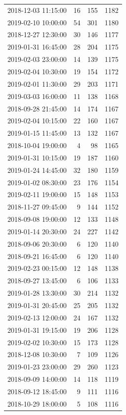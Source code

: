 \begin{tabular}{lrrr}
2018-12-03 11:15:00 & 16 & 155 & 1182 \\
2019-02-10 10:00:00 & 54 & 301 & 1180 \\
2018-12-27 12:30:00 & 30 & 146 & 1177 \\
2019-01-31 16:45:00 & 28 & 204 & 1175 \\
2019-02-03 23:00:00 & 14 & 139 & 1175 \\
2019-02-04 10:30:00 & 19 & 154 & 1172 \\
2019-02-01 11:30:00 & 29 & 203 & 1171 \\
2019-03-03 16:00:00 & 11 & 138 & 1168 \\
2018-09-28 21:45:00 & 14 & 174 & 1167 \\
2019-02-04 10:15:00 & 22 & 160 & 1167 \\
2019-01-15 11:45:00 & 13 & 132 & 1167 \\
2018-10-04 19:00:00 & 4 & 98 & 1165 \\
2019-01-31 10:15:00 & 19 & 187 & 1160 \\
2019-01-24 14:45:00 & 32 & 180 & 1159 \\
2019-01-02 08:30:00 & 23 & 176 & 1154 \\
2019-02-11 19:00:00 & 15 & 148 & 1153 \\
2018-11-27 09:45:00 & 9 & 144 & 1152 \\
2018-09-08 19:00:00 & 12 & 133 & 1148 \\
2019-01-14 20:30:00 & 24 & 227 & 1142 \\
2018-09-06 20:30:00 & 6 & 120 & 1140 \\
2018-09-21 16:45:00 & 6 & 120 & 1140 \\
2019-02-23 00:15:00 & 12 & 148 & 1138 \\
2018-09-27 13:45:00 & 6 & 106 & 1133 \\
2019-01-28 13:30:00 & 30 & 214 & 1132 \\
2019-01-31 20:45:00 & 25 & 205 & 1132 \\
2019-02-13 12:00:00 & 24 & 167 & 1132 \\
2019-01-31 19:15:00 & 19 & 206 & 1128 \\
2019-02-02 10:30:00 & 15 & 173 & 1128 \\
2018-12-08 10:30:00 & 7 & 109 & 1126 \\
2019-01-23 23:00:00 & 29 & 260 & 1123 \\
2018-09-09 14:00:00 & 14 & 118 & 1119 \\
2018-09-12 18:45:00 & 9 & 111 & 1116 \\
2018-10-29 18:00:00 & 5 & 108 & 1116 \\

\end{tabular}
